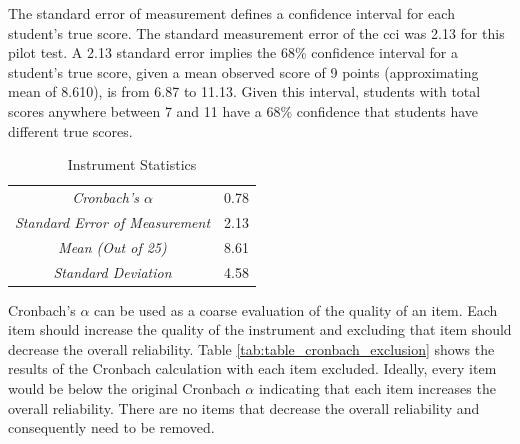 The standard error of measurement defines a confidence interval for each student's true score. The standard measurement error of the \gls{cci} was 2.13 for this pilot test. A 2.13 standard error implies the 68\% confidence interval for a student’s true score, given a mean observed score of 9 points (approximating mean of 8.610), is from 6.87 to 11.13. Given this interval, students with total scores anywhere between 7 and 11 have a 68\% confidence that students have different true scores. 


\begin{table}[!htbp]
\caption{Instrument Statistics}
\centering
\begin{tabular}{cc}
    \toprule
    \textit{Cronbach's $\alpha$} & 0.78 \\
    \textit{Standard Error of Measurement} & 2.13 \\
    \textit{Mean (Out of 25)} & 8.61\\
    \textit{Standard Deviation} & 4.58\\
    \bottomrule
\end{tabular}
\label{tab:overall}
\end{table}


Cronbach's $\alpha$ can be used as a coarse evaluation of the quality of an item. Each item should increase the quality of the instrument and excluding that item should decrease the overall reliability. Table \ref{tab:table_cronbach_exclusion} shows the results of the Cronbach calculation with each item excluded. Ideally, every item would be below the original Cronbach $\alpha$ indicating that each item increases the overall reliability. There are no items that decrease the overall reliability and consequently need to be removed.

